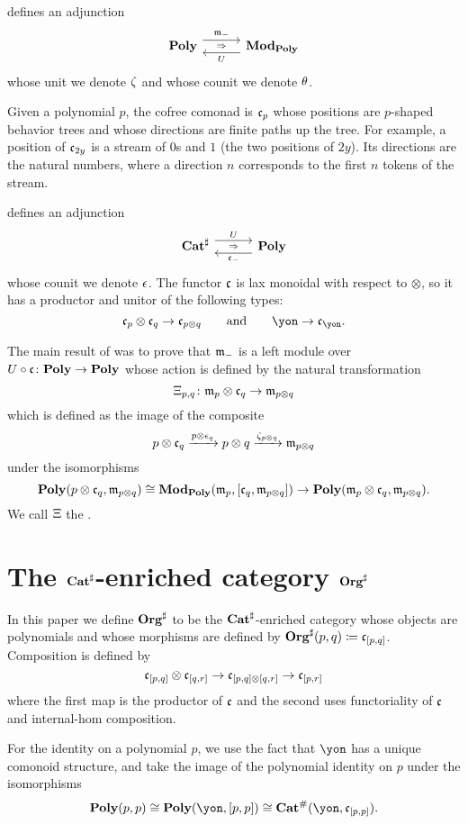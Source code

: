 \cite[Theorem 2.10]{libkind2024pattern} defines an adjunction
\[
    \adj{\poly}{\free_-}{U}{\modpoly}
\]
whose unit we denote $\zeta$ and whose counit we denote $\theta$.

Given a polynomial $p$, the cofree comonad is $\mathfrak{c}_p$ whose positions are $p$-shaped behavior trees and whose directions are finite paths up the tree. For example, a position of $\mathfrak{c}_{2y}$ is a stream of $0$s and $1$ (the two positions of $2y$). Its directions are the natural numbers, where a direction $n$ corresponds to the first $n$ tokens of the stream.

\cite[Theorem 3.2]{libkind2024pattern} defines an adjunction 
\[
    \adj{\catsharp}{U}{\cofree_-}{\poly}
\]
whose counit we denote $\epsilon$. The functor $\mathfrak{c}$ is lax monoidal with respect to $\otimes$, so it has a productor and unitor of the following types:
\[
\cofree_p\otimes\cofree_q\to\cofree_{p\otimes q}\qqand\yon\to\cofree_\yon.
\]

The main result of \cite[Theorem 3.4]{libkind2024pattern} was to prove that $\mathfrak{m}_-$ is a left module over $U \circ  \mathfrak{c} \colon \mathbf{Poly} \to \mathbf{Poly}$ whose action is defined by the natural transformation 
\[
    \Xi_{p,q}\colon \mathfrak{m}_p \otimes \mathfrak{c}_q \to \mathfrak{m}_{p \otimes q}
\] which is defined as the image of the composite
\[
    p \otimes \mathfrak{c}_q \xrightarrow{p \otimes \epsilon_q} p \otimes q \xrightarrow{\zeta_{p \otimes q}} \mathfrak{m}_{p \otimes q}
\] under the isomorphisms
\[
    \mathbf{Poly}(p \otimes \mathfrak{c}_q, \mathfrak{m}_{p\otimes q})  \cong \mathbf{Mod}_{\mathbf{Poly}}(\mathfrak{m}_p, [\mathfrak{c}_q, \mathfrak{m}_{p\otimes q}]) \to \mathbf{Poly}(\mathfrak{m}_p \otimes \mathfrak{c}_q, \mathfrak{m}_{p \otimes q}).
\] We call $\Xi$ the .



\section{The $\mathbf{Cat}^\sharp$-enriched category $\mathbf{Org}^\sharp$}\label{sec.orgsharp}

In this paper we define $\mathbf{Org}^\sharp$ to be the $\mathbf{Cat}^\sharp$-enriched category whose objects are polynomials and whose morphisms are defined by $\mathbf{Org}^\sharp(p, q) \coloneqq \mathfrak{c}_{[p,q]}$. 
Composition is defined by 
\[
    \mathfrak{c}_{[p,q]} \otimes \mathfrak{c}_{[q,r]} \to \mathfrak{c}_{[p, q] \otimes [q, r]} \to \mathfrak{c}_{[p, r]}
\]
where the first map is the productor of $\mathfrak{c}$ and the second uses functoriality of $\mathfrak{c}$ and internal-hom composition.

For the identity on a polynomial $p$, we use the fact that $\yon$ has a unique comonoid structure, and take the image of the polynomial identity on $p$ under the isomorphisms
\[
    \poly(p, p) \iso \poly(\yon , [p, p]) \iso \smcat^\#(\yon, \cofree_{[p,p]}).
\]

